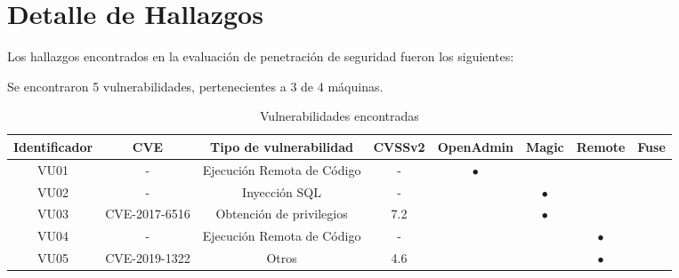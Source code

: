 \documentclass[a4paper]{article}
\begin{document}
\section{Detalle de Hallazgos}
\large{Los hallazgos encontrados en la evaluación de penetración de seguridad fueron los siguientes:}
\par
\vspace{0.1cm}
Se encontraron 5 vulnerabilidades, pertenecientes a 3 de 4 máquinas.
\par
\begin{table}[h]
    \centering
    \begin{tabular}{|c|c|c|c|c|c|c|c|} \hline
        \footnotesize{Identificador} & \footnotesize{CVE} & \footnotesize{Tipo de vulnerabilidad} & \footnotesize{CVSSv2} & \footnotesize{OpenAdmin} & \footnotesize{Magic} & \footnotesize{Remote} & \footnotesize{Fuse} \\ \hline
        \footnotesize{VU01} & - & \footnotesize{Ejecución Remota de Código} & - & \Large{\begin{math}\bullet\end{math}} &  &  &  \\ \hline
        \footnotesize{VU02} & - & \footnotesize{Inyección SQL} & - &  & \Large{\begin{math}\bullet\end{math}} &  &  \\ \hline
        \footnotesize{VU03} & \footnotesize{CVE-2017-6516} & \footnotesize{Obtención de privilegios} & \footnotesize{7.2} &  & \Large{\begin{math}\bullet\end{math}} &  &  \\ \hline
        \footnotesize{VU04} & - & \footnotesize{Ejecución Remota de Código} & - &  &  & \Large{\begin{math}\bullet\end{math}} &  \\ \hline
        \footnotesize{VU05} & \footnotesize{CVE-2019-1322} & \footnotesize{Otros} & \footnotesize{4.6} &  &  & \Large{\begin{math}\bullet\end{math}} &  \\ \hline
    \end{tabular}
    \caption{Vulnerabilidades encontradas}
\end{table}
\end{document}
